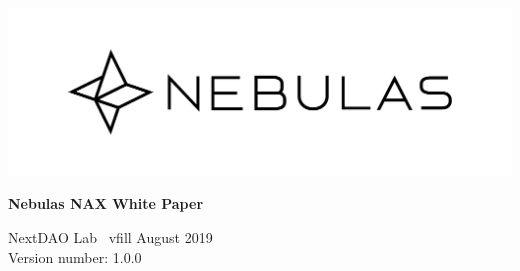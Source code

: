\documentclass[12pt]{article}
\begin{document}
\pagestyle{empty}
\renewcommand{\contentsname}{catalog}
\renewcommand{\abstractname}{Abstract}
\renewcommand{\refname}{References}
\renewcommand{\figurename}{图}
\renewcommand{\tablename}{表}
\renewcommand{\baselinestretch}{1.5}
\renewcommand{\appendixname}{Appendix}
\renewcommand{\proofname}{proof}


\begin{titlepage}
  \begin{center}
    \vspace*{5.5cm}
    \includegraphics[scale=0.4]{../common/Nebulas.png}
    \vspace{0.5cm}


    \textbf{\huge{Nebulas NAX White Paper}}

    \vspace{0.5cm}
    NextDAO Lab
    \ vfill
    August 2019\\
    Version number: 1.0.0
    \textbf{}
  \end{center}

\end{titlepage}
\setcounter{page}{0}
\tableofcontents
\newpage
\setcounter{page}{1}
\pagestyle{fancy}
\vspace*{0.01cm}
%





\newpage


\newpage 
\begin{appendices}


\end{appendices}
\end{document}
